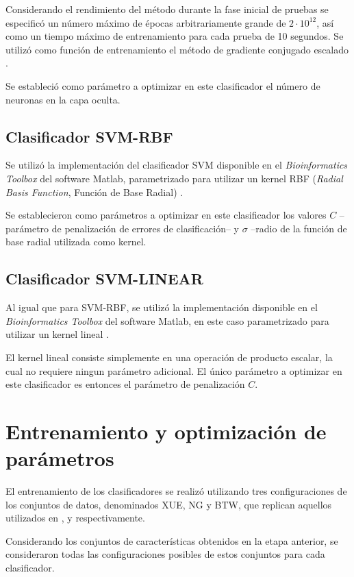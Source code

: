 \documentclass[12pt,bibliography=oldstyle,DIV=12,parskip=half-,titlepage]{scrartcl}
\begin{document}
Considerando el rendimiento del método durante la fase inicial de
pruebas se especificó un número máximo de épocas arbitrariamente
grande de $2\cdot10^{12}$, así como un tiempo máximo de entrenamiento
para cada prueba de 10 segundos. Se utilizó como función de
entrenamiento el método de gradiente conjugado escalado
\cite{moeller}.

Se estableció como parámetro a optimizar en este clasificador el
número de neuronas en la capa oculta.
%
\subsection{Clasificador SVM-RBF}
Se utilizó la implementación del clasificador SVM disponible en el
\emph{Bioinformatics Toolbox} del software Matlab, parametrizado para
utilizar un kernel RBF (\emph{Radial Basis Function}, Función de Base
Radial) \cite{svm}.

Se establecieron como parámetros a optimizar en este clasificador los
valores $C$ --parámetro de penalización de errores de clasificación--
y $\sigma$ --radio de la función de base radial utilizada como kernel.
%
\subsection{Clasificador SVM-LINEAR}
Al igual que para SVM-RBF, se utilizó la implementación disponible en
el \emph{Bioinformatics Toolbox} del software Matlab, en este caso
parametrizado para utilizar un kernel lineal \cite{svm}.

El kernel lineal consiste simplemente en una operación de producto
escalar, la cual no requiere ningun parámetro adicional. El único
parámetro a optimizar en este clasificador es entonces el parámetro de
penalización $C$.
%
\section{Entrenamiento y optimización de parámetros}
El entrenamiento de los clasificadores se realizó utilizando tres
configuraciones de los conjuntos de datos, denominados XUE, NG y BTW, que replican aquellos
utilizados en \cite{xue}, \cite{ng} y \cite{batuwita} respectivamente.

Considerando los conjuntos de características obtenidos en la etapa
anterior, se consideraron todas las configuraciones posibles de estos
conjuntos para cada clasificador.

%
\end{document}
